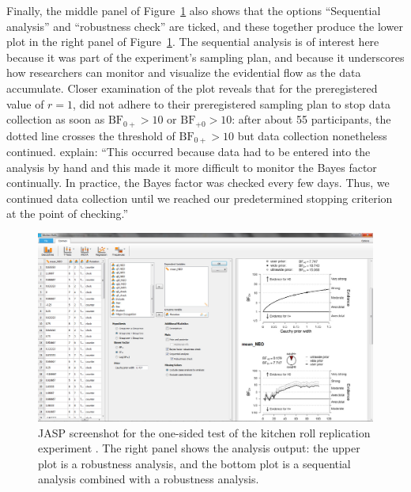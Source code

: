 Finally, the middle panel of Figure~\ref{fig:bi2:ScreenshotRollsRobustSequential} also shows that the options ``Sequential analysis'' and ``robustness check'' are ticked, and these together produce the lower plot in the right panel of Figure~\ref{fig:bi2:ScreenshotRollsRobustSequential}. The sequential analysis is of interest here because it was part of the experiment's sampling plan, and because it underscores how researchers can monitor and visualize the evidential flow as the data accumulate. Closer examination of the plot reveals that for the preregistered value of $r=1$,  did not adhere to their preregistered sampling plan to stop data collection as soon as $\text{BF}_{0+} > 10$ or $\text{BF}_{+0} > 10$: after about 55 participants, the dotted line crosses the threshold of $\text{BF}_{0+} > 10$ but data collection nonetheless continued.  explain: ``This occurred because data had to be entered into the analysis by hand and this made it more difficult to monitor the Bayes factor continually. In practice, the Bayes factor was checked every few days. Thus, we continued data collection until we reached our predetermined stopping criterion at the point of checking.''

\begin{figure}[tp]
    \begin{center}
        \includegraphics[width=.99\textwidth]{figs/bi2_ScreenshotRollsRobustSequential.eps}
        \caption{JASP screenshot for the one-sided test of the kitchen roll replication experiment \protect\cite{WagenmakersEtAl2015Kitchen}. The right panel shows the analysis output: the upper plot is a robustness analysis, and the bottom plot is a sequential analysis combined with a robustness analysis.} \label{fig:bi2:ScreenshotRollsRobustSequential}
    \end{center}
\end{figure}

